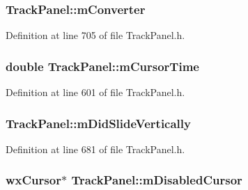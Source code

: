\subsubsection[{\texorpdfstring{m\+Converter}{mConverter}}]{ Track\+Panel\+::m\+Converter\hspace{0.3cm}{\ttfamily [protected]}}\hypertarget{class_track_panel_ac12384f2e976cb0cc56f2e6b8ca22de0}{}\label{class_track_panel_ac12384f2e976cb0cc56f2e6b8ca22de0}


Definition at line 705 of file Track\+Panel.\+h.

\subsubsection[{\texorpdfstring{m\+Cursor\+Time}{mCursorTime}}]{\setlength{\rightskip}{0pt plus 5cm}double Track\+Panel\+::m\+Cursor\+Time\hspace{0.3cm}{\ttfamily [protected]}}\hypertarget{class_track_panel_ae4269832b66adecb9fb64fbf9263d170}{}\label{class_track_panel_ae4269832b66adecb9fb64fbf9263d170}


Definition at line 601 of file Track\+Panel.\+h.

\subsubsection[{\texorpdfstring{m\+Did\+Slide\+Vertically}{mDidSlideVertically}}]{ Track\+Panel\+::m\+Did\+Slide\+Vertically\hspace{0.3cm}{\ttfamily [protected]}}\hypertarget{class_track_panel_ab732e997531f9dbf44e50e8f97eda6ee}{}\label{class_track_panel_ab732e997531f9dbf44e50e8f97eda6ee}


Definition at line 681 of file Track\+Panel.\+h.

\subsubsection[{\texorpdfstring{m\+Disabled\+Cursor}{mDisabledCursor}}]{\setlength{\rightskip}{0pt plus 5cm}wx\+Cursor$\ast$ Track\+Panel\+::m\+Disabled\+Cursor\hspace{0.3cm}{\ttfamily [protected]}}\hypertarget{class_track_panel_a5552caee45635cb3bae1338fbe51b18c}{}\label{class_track_panel_a5552caee45635cb3bae1338fbe51b18c}


